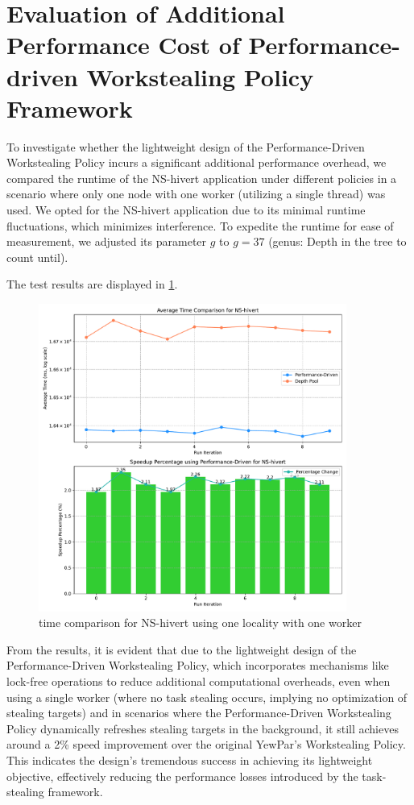 \documentclass{mproj}
\begin{document}
\section{Evaluation of Additional Performance Cost of Performance-driven Workstealing Policy Framework}

To investigate whether the lightweight design of the Performance-Driven Workstealing Policy incurs a significant additional performance overhead,
we compared the runtime of the NS-hivert application under different policies in a scenario where only one node with one worker (utilizing a single thread) was used.
We opted for the NS-hivert application due to its minimal runtime fluctuations, which minimizes interference.
To expedite the runtime for ease of measurement,
we adjusted its parameter \( g \) to \( g = 37 \) (genus: Depth in the tree to count until).

The test results are displayed in \cref{fig:time_comparison_ns_one_worker}.
\begin{figure}[h]
    \centering
    \includegraphics[width=0.9\textwidth]{images/time_comparison_ns_one_worker.pdf}
    \caption{time comparison for NS-hivert using one locality with one worker}
    \label{fig:time_comparison_ns_one_worker}
\end{figure}
\FloatBarrier

From the results, it is evident that due to the lightweight design of the Performance-Driven Workstealing Policy,
which incorporates mechanisms like lock-free operations to reduce additional computational overheads,
even when using a single worker (where no task stealing occurs, implying no optimization of stealing targets)
and in scenarios where the Performance-Driven Workstealing Policy dynamically refreshes stealing targets in the background,
it still achieves around a 2\% speed improvement over the original YewPar's Workstealing Policy.
This indicates the design's tremendous success in achieving its lightweight objective,
effectively reducing the performance losses introduced by the task-stealing framework.
\end{document}
